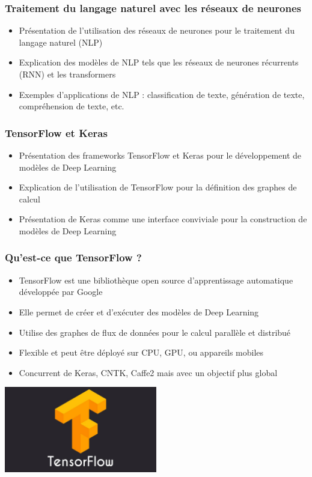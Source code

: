 \documentclass{beamer}
\begin{document}
\begin{frame}
	\frametitle{Traitement du langage naturel avec les réseaux de neurones}
	\begin{itemize}
		\item Présentation de l'utilisation des réseaux de neurones pour le traitement du langage naturel (NLP)
		\item Explication des modèles de NLP tels que les réseaux de neurones récurrents (RNN) et les transformers
		\item Exemples d'applications de NLP : classification de texte, génération de texte, compréhension de texte, etc.
	\end{itemize}
\end{frame}


\begin{frame}
	\frametitle{TensorFlow et Keras}
	\begin{itemize}
		\item Présentation des frameworks TensorFlow et Keras pour le développement de modèles de Deep Learning
		\item Explication de l'utilisation de TensorFlow pour la définition des graphes de calcul
		\item Présentation de Keras comme une interface conviviale pour la construction de modèles de Deep Learning
	\end{itemize}
\end{frame}



	\begin{frame}
		\frametitle{Qu'est-ce que TensorFlow ?}
		\begin{itemize}
			\item TensorFlow est une bibliothèque open source d'apprentissage automatique développée par Google
			\item Elle permet de créer et d'exécuter des modèles de Deep Learning
			\item Utilise des graphes de flux de données pour le calcul parallèle et distribué
			\item Flexible et peut être déployé sur CPU, GPU, ou appareils mobiles
			\item Concurrent de Keras, CNTK, Caffe2 mais avec un objectif plus global
		\end{itemize}
		\centering
	\includegraphics[width=0.5\textwidth]{xIp6NSz.jpg}
	\end{frame}
	
\end{document}
